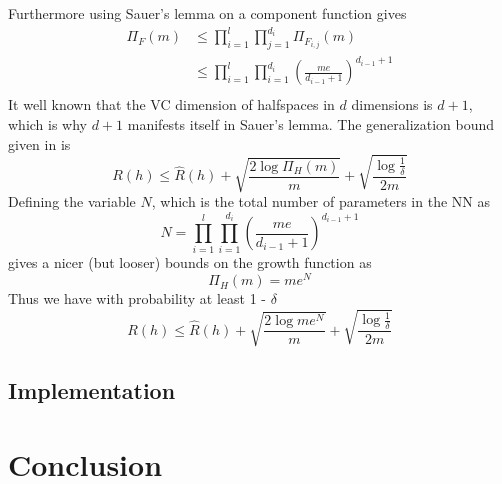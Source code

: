 \documentclass{article} %
\begin{document}
Furthermore using Sauer's lemma on a component function gives
\begin{align*}
\Pi_F(m)& \leq \prod_{i=1}^l\prod_{j=1}^{d_i} \Pi_{F_{i,j}}(m)\\
& \leq \prod_{i=1}^l\prod_{i=1}^{d_i}(\frac{me}{d_{i-1}+1})^{d_{i-1}+1}\\
\end{align*}
It well known that the VC dimension of halfspaces in $d$ dimensions is $d +1$, which is why $d+1$ manifests itself in Sauer's lemma.
The generalization bound given in \cite{mohri_foundations_2012} is 
$$
R(h) \leq \widehat{R}(h) + \sqrt{\frac{2\log{\Pi_H{(m)}}}{m}} + \sqrt{\frac{\log{\frac{1}{\delta}}}{2m}}
$$
Defining the variable $N$, which is the total number of parameters in the NN as 
$$
N = \prod_{i=1}^l\prod_{i=1}^{d_i}(\frac{me}{d_{i-1}+1})^{d_{i-1}+1}
$$ 
gives a nicer (but looser) bounds on the growth function as
$$
\Pi_H{(m)} = me^N
$$
Thus we have with probability at least 1 - $\delta$
$$
R(h) \leq \widehat{R}(h) + \sqrt{\frac{2\log{me^N}}{m}} + \sqrt{\frac{\log{\frac{1}{\delta}}}{2m}}
$$
\subsection{Implementation}
\section{Conclusion}



\nocite{yang_multiagent_2004}
\nocite{kim_autonomous_2003}
\nocite{mohri_foundations_2012}

\newpage
{}





\end{document}
